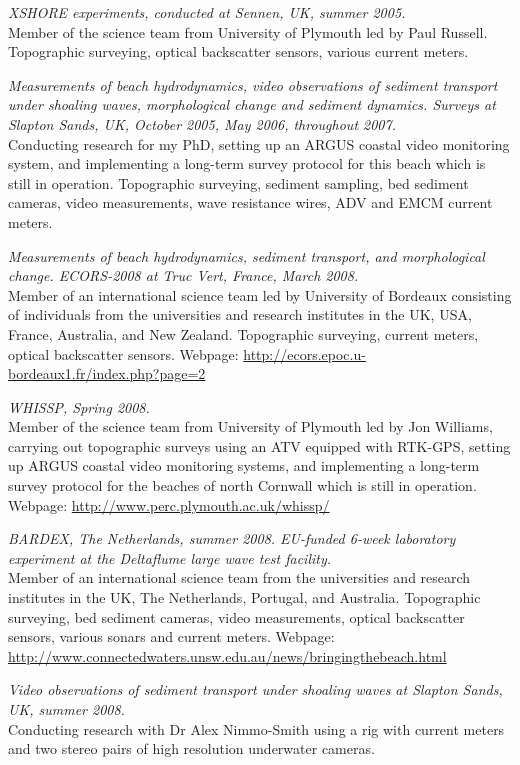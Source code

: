 \documentclass[margin,line]{resume}
\begin{document}
\begin{resume}
\begin{footnotesize}
    {\sl XSHORE experiments, conducted at Sennen, UK, summer 2005.} \\
    Member of the science team from University of Plymouth led by Paul Russell. Topographic surveying, optical backscatter sensors, various current meters.

    {\sl Measurements of beach hydrodynamics, video observations of sediment transport under shoaling waves, morphological change and sediment dynamics. Surveys at Slapton Sands, UK, October 2005, May 2006, throughout 2007.} \\
    Conducting research for my PhD, setting up an ARGUS coastal video monitoring system, and implementing a long-term survey protocol for this beach which is still in operation. Topographic surveying, sediment sampling, bed sediment cameras, video measurements, wave resistance wires, ADV and EMCM current meters.

    {\sl Measurements of beach hydrodynamics, sediment transport, and morphological change. ECORS-2008 at Truc Vert, France, March 2008.} \\
    Member of an international science team led by University of Bordeaux consisting of individuals from the universities and research institutes in the UK, USA, France, Australia, and New Zealand. Topographic surveying, current meters, optical backscatter sensors. Webpage: \url{http://ecors.epoc.u-bordeaux1.fr/index.php?page=2}

    {\sl WHISSP, Spring 2008.} \\
    Member of the science team from University of Plymouth led by Jon Williams, carrying out topographic surveys using an ATV equipped with RTK-GPS, setting up ARGUS coastal video monitoring systems, and implementing a long-term survey protocol for the beaches of north Cornwall which is still in operation. Webpage: \url{http://www.perc.plymouth.ac.uk/whissp/}

    {\sl BARDEX, The Netherlands, summer 2008. EU-funded 6-week laboratory experiment at the Deltaflume large wave test facility.} \\
    Member of an international science team from the universities and research institutes in the UK, The Netherlands, Portugal, and Australia. Topographic surveying, bed sediment cameras, video measurements, optical backscatter sensors, various sonars and current meters. Webpage: \url{http://www.connectedwaters.unsw.edu.au/news/bringingthebeach.html}

    {\sl Video observations of sediment transport under shoaling waves at Slapton Sands, UK, summer 2008.} \\
    Conducting research with Dr Alex Nimmo-Smith using a rig with current meters and two stereo pairs of high resolution underwater cameras.


\end{footnotesize}
\end{resume}
\end{document}
